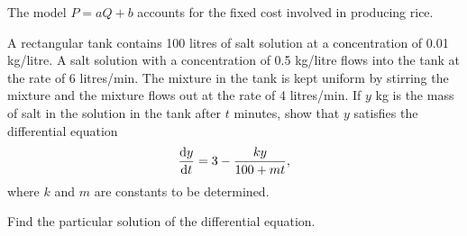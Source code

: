 \documentclass{echw}
\begin{document}
            \begin{center}
            \end{center}

            The model $P = aQ + b$ accounts for the fixed cost involved in producing rice.

    \problem{}
        A rectangular tank contains 100 litres of salt solution at a concentration of 0.01 kg/litre. A salt solution with a concentration of 0.5 kg/litre flows into the tank at the rate of 6 litres/min. The mixture in the tank is kept uniform by stirring the mixture and the mixture flows out at the rate of 4 litres/min. If $y$ kg is the mass of salt in the solution in the tank after $t$ minutes, show that $y$ satisfies the differential equation \[\dfrac{\mathrm{d} y}{\mathrm{d} t} = 3 - \dfrac{ky}{100 + mt},\] where $k$ and $m$ are constants to be determined.

        Find the particular solution of the differential equation.
\end{document}
